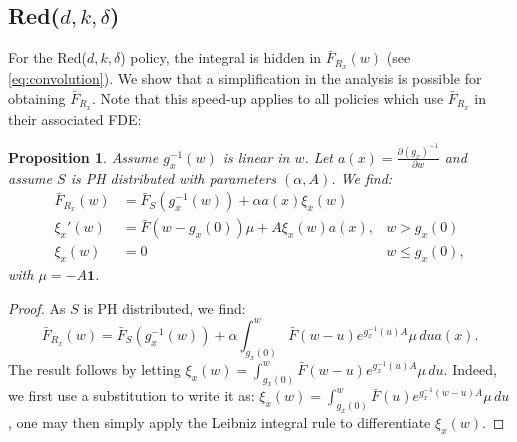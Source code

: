 \documentclass[12pt]{report}
\newtheorem{proposition}[theorem]{Proposition}
\begin{document}
\subsection{Red($d,k,\delta$)}
For the Red($d,k,\delta$) policy, the integral is hidden in $\bar F_{R_x}(w)$ (see \eqref{eq:convolution}). We show that a simplification in the analysis is possible for obtaining $\bar F_{R_x}$. Note that this speed-up applies to all policies which use $\bar F_{R_x}$ in their 
associated FDE:
\begin{proposition}\label{prop:F_Rx}
Assume $g_x^{-1}(w)$ is linear in $w$. Let $a(x)=\frac{\partial (g_x)^{-1}}{\partial w}$ and assume $S$ is PH distributed with parameters $(\alpha, A)$. We find:
\begin{align*}
\bar F_{R_x}(w)&=\bar F_S(g_x^{-1}(w))+\alpha a(x) \xi_x(w) &\\
\xi_x'(w)&=\bar F(w-g_x(0)) \mu + A \xi_x(w) a(x), & w > g_x(0) \\
\xi_x(w)&=0& w \leq g_x(0),
\end{align*}
with $\mu = -A \textbf{1}$.
\end{proposition}
\begin{proof}
As $S$ is PH distributed, we find:
$$
\bar F_{R_x}(w)
= 
\bar F_S(g_x^{-1}(w))+\alpha \int_{g_x(0)}^w \bar F(w-u) e^{g_x^{-1}(u)A} \mu \, du a(x).
$$
The result follows by letting $\xi_x(w)= \int_{g_x(0)}^w \bar F(w-u) e^{g_x^{-1}(u) A} \mu\, du$. Indeed, we first use a substitution to write it as:
$\xi_x(w)= \int_{g_x(0)}^w \bar F(u) e^{g_x^{-1}(w-u) A} \mu\, du$, one may then simply apply the
Leibniz integral rule to differentiate $\xi_x(w)$.
\end{proof}
\end{document}
